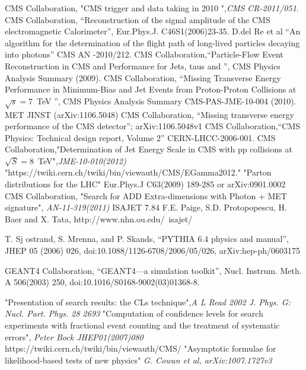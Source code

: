\begin{thebibliography}{9}
CMS Collaboration, "CMS trigger and data taking in 2010 ",\emph{CMS CR-2011/051}.
CMS Collaboration, ``Reconstruction of the signal amplitude of the CMS electromagnetic Calorimeter'', Eur.Phys.J. C46S1(2006)23-35.
 D.del Re et al ``An algorithm for the determination of the flight path of long-lived particles decaying into photons'' CMS AN -2010/212.
CMS Collaboration,``Particle-Flow Event Reconstruction in CMS and Performance for Jets, taus and \ETslash'', CMS Physics Analysis Summary (2009).
CMS Collaboration, “Missing Transverse Energy Performance in Minimum-Bias and Jet Events from Proton-Proton Collisions at $\sqrt{s} =7$~TeV ”, CMS Physics Analysis Summary CMS-PAS-JME-10-004 (2010).
MET JINST (arXiv:1106.5048)
CMS Collaboration, ``Missing transverse energy performance of the CMS detector''; arXiv:1106.5048v1
CMS Collaboration,``CMS Physics: Technical design report, Volume 2'' CERN-LHCC-2006-001.
 CMS Collaboration,"Determination of Jet Energy Scale in CMS with pp collisions at $\sqrt{S} = 8$~TeV",\textit{JME-10-010(2012)}
 "https://twiki.cern.ch/twiki/bin/viewauth/CMS/EGamma2012."
 "Parton distributions for the LHC" Eur.Phys.J C63(2009) 189-285 or arXiv:0901.0002
 CMS Collaboration, "Search for ADD Extra-dimensions with Photon + MET signature", \textit{AN-11-319(2011)}
 ISAJET 7.84 F.E. Paige, S.D. Protopopescu, H. Baer and X. Tata, http://www.nhn.ou.edu/~isajet/

 T. Sj ostrand, S. Mrenna, and P. Skands, “PYTHIA 6.4 physics and manual”, JHEP 05 (2006) 026, doi:10.1088/1126-6708/2006/05/026, arXiv:hep-ph/0603175

 GEANT4 Collaboration, “GEANT4—a simulation toolkit”, Nucl. Instrum. Meth. A 506(2003) 250, doi:10.1016/S0168-9002(03)01368-8.

 "Presentation of search results: the CLs technique",\textit{A L Read 2002 J. Phys. G: Nucl. Part. Phys. 28 2693}
 "Computation of confidence levels for search experiments with fractional event counting and the treatment of systematic errors", \textit{Peter Bock JHEP01(2007)080}
 https://twiki.cern.ch/twiki/bin/viewauth/CMS/
  "Asymptotic formulae for likelihood-based tests of new physics" \textit{G. Cowan et al, arXiv:1007.1727v3}

\end{thebibliography}